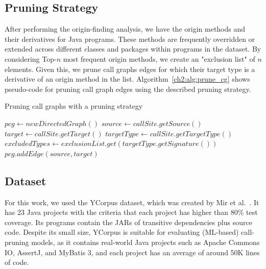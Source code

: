\subsection{Pruning Strategy}
After performing the origin-finding analysis, we have the origin methods and their derivatives for Java programs. These methods are frequently overridden or extended across different classes and packages within programs in the dataset. By considering Top-$n$ most frequent origin methods, we create an "exclusion list" of $n$ elements. Given this, we prune call graphs edges for which their target type is a derivative of an origin method in the list. Algorithm~\ref{ch2:alg:prune_cg} shows pseudo-code for pruning call graph edges using the described pruning strategy.

\begin{algorithm}[t]
\caption{Pruning call graphs with a pruning strategy} \label{ch2:alg:prune_cg}
\begin{algorithmic}[1]
\footnotesize
{}
    \State $pcg \gets new DirectedGraph()$ 
        \State $source \gets callSite.getSource()$
        \State $target \gets callSite.getTarget()$
        \State $targetType \gets callSite.getTargetType()$
        \State $excludedTypes \gets exclusionList.get(targetType.getSignature())$
            \State $pcg.addEdge(source, target)$
        \EndIf
    \EndFor
    \State {}
\EndFunction

            \State {}
        \EndIf
    \EndFor
    \State {}
\EndFunction
\end{algorithmic}
\end{algorithm}

\subsection{Dataset}
For this work, we used the YCorpus dataset, which was created by Mir et al.~\cite{mir2024effectiveness}. It has 23 Java projects with the criteria that each project has higher than 80\% test coverage. Its programs contain the JARs of transitive dependencies plus source code. Despite its small size, YCorpus is suitable for evaluating (ML-based) call-pruning models, as it contains real-world Java projects such as Apache Commons IO, AssertJ, and MyBatis 3, and each project has an average of around 50K lines of code.

